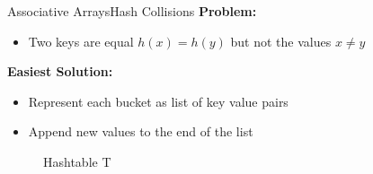 \begin{frame}{Associative Arrays}{Hash Collisions}
  \textbf{Problem:}
  \begin{itemize}
    \item
      Two keys are equal {\color{Mittel-Blau} $h(x) = h(y)$} but not the values {\color{Mittel-Blau} $x \neq y$}
  \end{itemize}
   \textbf{Easiest Solution:}
  \begin{itemize}
    \item<3->
      Represent each bucket as list of key value pairs
    \item<4->
      Append new values to the end of the list
  \end{itemize}
    \vspace*{-1.0em}
    \begin{figure}
    \caption{Hashtable T}
    \centering
  \end{figure}
\end{frame}




